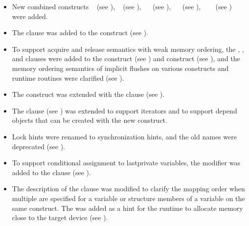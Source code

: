 \begin{itemize}
\item New combined constructs ~
     (see ), ~
     (see ), 
     ~~ 
     (see ),
     ~~ 
     (see ),
     ~~~
     (see ) were added.

\item The  clause was added to the  construct
      (see ).

\item To support acquire and release semantics with weak memory ordering, the
      , , and  clauses were added to
      the  construct (see ) and
       construct (see ), and the
      memory ordering semantics of implicit flushes on various constructs and
      runtime routines were clarified (see ).

\item The  construct was extended with the  clause
      (see ).

\item The  clause (see ) was
      extended to support iterators and to support depend objects that can be created with the new
       construct.

\item Lock hints were renamed to synchronization hints, and the
      old names were deprecated (see ).

\item To support conditional assignment to lastprivate variables, the
       modifier was added to the 
      clause (see ).

\item The description of the  clause was modified to clarify 
      the mapping order when multiple  are specified for
      a variable or structure members of a variable on the same
      construct. The   was added as a hint
      for the runtime to allocate memory close to the target device 
      (see ).


\end{itemize}
